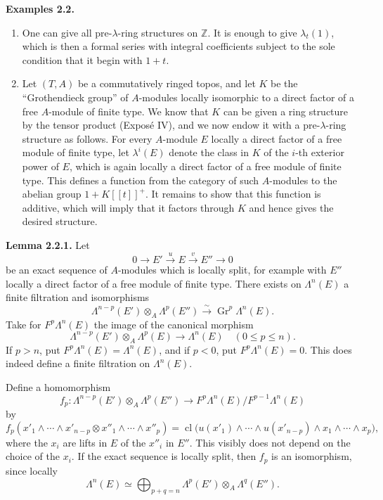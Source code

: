 \textbf{Examples 2.2.}
\begin{enumerate}[label=\alph*)]
\item One can give all pre-\(\lambda\)-ring structures on \(\mathbb Z\). It is enough to give \(\lambda_t(1)\), which is then a formal series with integral coefficients subject to the sole condition that it begin with \(1+t\).

\item Let \((T,A)\) be a commutatively ringed topos, and let \(K\) be the ``Grothendieck group'' of \(A\)-modules locally isomorphic to a direct factor of a free \(A\)-module of finite type. We know that \(K\) can be given a ring structure by the tensor product (Exposé IV), and we now endow it with a pre-\(\lambda\)-ring structure as follows. For every \(A\)-module \(E\) locally a direct factor of a free module of finite type, let \(\lambda^i(E)\) denote the class in \(K\) of the \(i\)-th exterior power of \(E\), which is again locally a direct factor of a free module of finite type. This defines a function from the category of such \(A\)-modules to the abelian group \(1+K[[t]]^+\). It remains to show that this function is additive, which will imply that it factors through \(K\) and hence gives the desired structure.
\end{enumerate}

\textbf{Lemma 2.2.1.} Let
\[
  0\longrightarrow E' \xrightarrow{u} E \xrightarrow{v} E''\longrightarrow 0
\]
be an exact sequence of \(A\)-modules which is locally split, for example with \(E''\) locally a direct factor of a free module of finite type. There exists on \(\Lambda^n(E)\) a finite filtration and isomorphisms
\[
  \Lambda^{n-p}(E')\otimes_A\Lambda^p(E'')
  \xrightarrow{\sim}
  \operatorname{Gr}^p\Lambda^n(E).
\]
Take for \(F^p\Lambda^n(E)\) the image of the canonical morphism
\[
  \Lambda^{n-p}(E')\otimes_A\Lambda^p(E)\longrightarrow \Lambda^n(E)
  \quad (0\leq p\leq n).
\]
If \(p>n\), put \(F^p\Lambda^n(E)=\Lambda^n(E)\), and if \(p<0\), put \(F^p\Lambda^n(E)=0\). This does indeed define a finite filtration on \(\Lambda^n(E)\).

Define a homomorphism
\[
  f_p:\Lambda^{n-p}(E')\otimes_A\Lambda^p(E'')
  \longrightarrow
  F^p\Lambda^n(E)/F^{p-1}\Lambda^n(E)
\]
by
\[
  f_p(x'_1\wedge\cdots\wedge x'_{n-p}\otimes x''_1\wedge\cdots\wedge x''_p)
  =
  \operatorname{cl}\bigl(u(x'_1)\wedge\cdots\wedge u(x'_{n-p})\wedge
  x_1\wedge\cdots\wedge x_p\bigr),
\]
where the \(x_i\) are lifts in \(E\) of the \(x''_i\) in \(E''\). This visibly does not depend on the choice of the \(x_i\). If the exact sequence is locally split, then \(f_p\) is an isomorphism, since locally
\[
  \Lambda^n(E)\simeq\bigoplus_{p+q=n}
  \Lambda^p(E')\otimes_A\Lambda^q(E'').
\]

